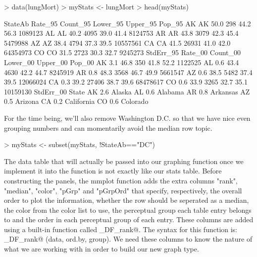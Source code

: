 \documentclass{article}
\begin{document}
\begin{Schunk}
\begin{Sinput}
> data(lungMort)
> myStats <- lungMort
> head(myStats)
\end{Sinput}
\begin{Soutput}
   StateAb Rate_95 Count_95 Lower_95 Upper_95   Pop_95
AK      AK    50.0      298     44.2     56.3  1089123
AL      AL    40.2     4095     39.0     41.4  8124753
AR      AR    43.8     3079     42.3     45.4  5479988
AZ      AZ    38.4     4794     37.3     39.5 10557561
CA      CA    41.5    26931     41.0     42.0 64354973
CO      CO    31.5     2723     30.3     32.7  9245273
   StdErr_95 Rate_00 Count_00 Lower_00 Upper_00   Pop_00
AK       3.1    46.8      350     41.8     52.2  1122525
AL       0.6    43.4     4630     42.2     44.7  8245919
AR       0.8    48.3     3568     46.7     49.9  5661547
AZ       0.6    38.5     5482     37.4     39.5 12066024
CA       0.3    39.2    27406     38.7     39.6 68478617
CO       0.6    33.9     3265     32.7     35.1 10159130
   StdErr_00      State
AK       2.6     Alaska
AL       0.6    Alabama
AR       0.8   Arkansas
AZ       0.5    Arizona
CA       0.2 California
CO       0.6   Colorado
\end{Soutput}
\end{Schunk}

For the time being, we'll also remove Washington D.C. so that we have nice even grouping numbers and can
momentarily avoid the median row topic.

\begin{Schunk}
\begin{Sinput}
> myStats <- subset(myStats, !StateAb=="DC")
\end{Sinput}
\end{Schunk}

The data table that will actually be passed into our graphing function once we implement it into the function is not exactly like our stats table. Before constructing the panels, the mmplot function adds the extra columns "rank",
"median", "color", "pGrp" and "pGrpOrd" that specify, respectively, the overall order to plot the information, whether the row should be seperated as a median, the color from the color list to use, the perceptual group each table
entry belongs to and the order in each perceptual group of each entry. These columns are added using a built-in function called \verb@create_DF_rank@. The syntax for this function is: \verb@create_DF_rank@ (data, ord.by, group). We
need these columns to know the nature of what we are working with in order to build our new graph type.
\end{document}

